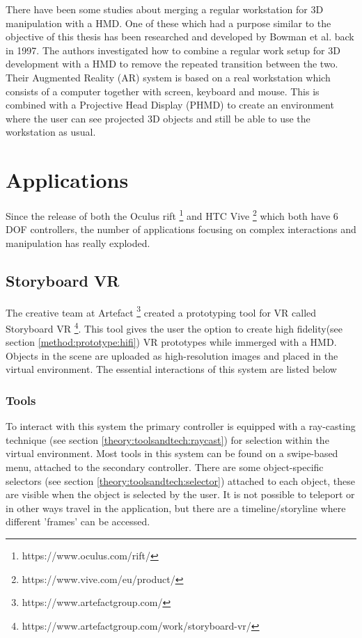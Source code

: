 There have been some studies about merging a regular workstation for 3D manipulation with a HMD. One of these which had a purpose similar to the objective of this thesis has been researched and developed by Bowman et al. back in 1997. \cite{relatedwork:kijimaand1997transition} The authors investigated how to combine a regular work setup for 3D development with a HMD to remove the repeated transition between the two. Their Augmented Reality (AR) system is based on a real workstation which consists of a computer together with screen, keyboard and mouse. This is combined with a Projective Head Display (PHMD) to create an environment where the user can see projected 3D objects and still be able to use the workstation as usual.
\section{Applications}
Since the release of both the Oculus rift \footnote{https://www.oculus.com/rift/} and HTC Vive \footnote{https://www.vive.com/eu/product/} which both have 6 DOF controllers, the number of applications focusing on complex interactions and manipulation has really exploded.
\subsection{Storyboard VR}
The creative team at Artefact \footnote{https://www.artefactgroup.com/} created a prototyping tool for VR called Storyboard VR \footnote{https://www.artefactgroup.com/work/storyboard-vr/}. This tool gives the user the option to create high fidelity(see section \ref{method:prototype:hifi})  VR prototypes while immerged with a HMD. Objects in the scene are uploaded as high-resolution images and placed in the virtual environment. The essential interactions of this system are listed below
\subsubsection{Tools}
To interact with this system the primary controller is equipped with a ray-casting technique (see section \ref{theory:toolsandtech:raycast}) for selection within the virtual environment.
Most tools in this system can be found on a swipe-based menu, attached to the secondary controller. There are some object-specific selectors (see section \ref{theory:toolsandtech:selector}) attached to each object, these are visible when the object is selected by the user. It is not possible to teleport or in other ways travel in the application, but there are  a timeline/storyline where different 'frames' can be accessed.

